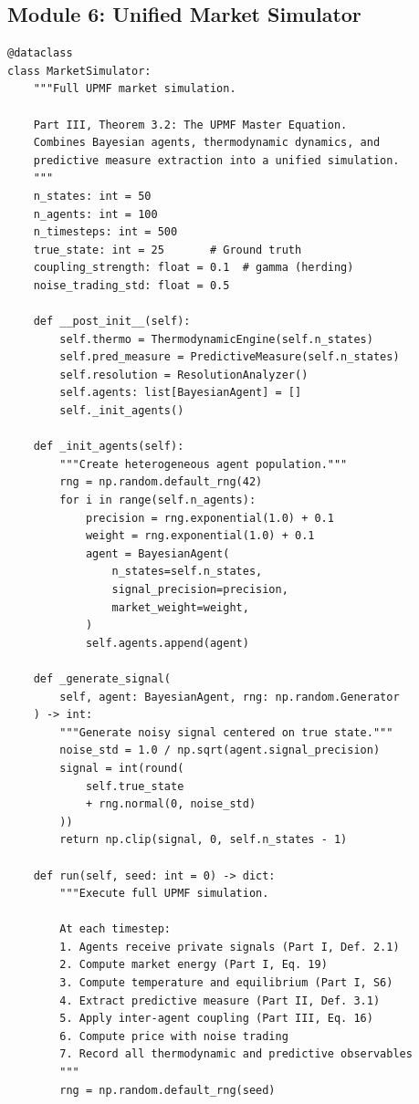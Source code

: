 \documentclass[12pt,a4paper]{article}
\theoremstyle{definition}
\begin{document}
\subsection{Module 6: Unified Market Simulator}

\begin{lstlisting}[caption={Market Simulator --- Full UPMF dynamics (Part~III, Thm.~3.2)},label=lst:simulator]
@dataclass
class MarketSimulator:
    """Full UPMF market simulation.
    
    Part III, Theorem 3.2: The UPMF Master Equation.
    Combines Bayesian agents, thermodynamic dynamics, and
    predictive measure extraction into a unified simulation.
    """
    n_states: int = 50
    n_agents: int = 100
    n_timesteps: int = 500
    true_state: int = 25       # Ground truth
    coupling_strength: float = 0.1  # gamma (herding)
    noise_trading_std: float = 0.5
    
    def __post_init__(self):
        self.thermo = ThermodynamicEngine(self.n_states)
        self.pred_measure = PredictiveMeasure(self.n_states)
        self.resolution = ResolutionAnalyzer()
        self.agents: list[BayesianAgent] = []
        self._init_agents()
    
    def _init_agents(self):
        """Create heterogeneous agent population."""
        rng = np.random.default_rng(42)
        for i in range(self.n_agents):
            precision = rng.exponential(1.0) + 0.1
            weight = rng.exponential(1.0) + 0.1
            agent = BayesianAgent(
                n_states=self.n_states,
                signal_precision=precision,
                market_weight=weight,
            )
            self.agents.append(agent)
    
    def _generate_signal(
        self, agent: BayesianAgent, rng: np.random.Generator
    ) -> int:
        """Generate noisy signal centered on true state."""
        noise_std = 1.0 / np.sqrt(agent.signal_precision)
        signal = int(round(
            self.true_state
            + rng.normal(0, noise_std)
        ))
        return np.clip(signal, 0, self.n_states - 1)
    
    def run(self, seed: int = 0) -> dict:
        """Execute full UPMF simulation.
        
        At each timestep:
        1. Agents receive private signals (Part I, Def. 2.1)
        2. Compute market energy (Part I, Eq. 19)
        3. Compute temperature and equilibrium (Part I, S6)
        4. Extract predictive measure (Part II, Def. 3.1)
        5. Apply inter-agent coupling (Part III, Eq. 16)
        6. Compute price with noise trading
        7. Record all thermodynamic and predictive observables
        """
        rng = np.random.default_rng(seed)
        

\end{lstlisting}
\end{document}
